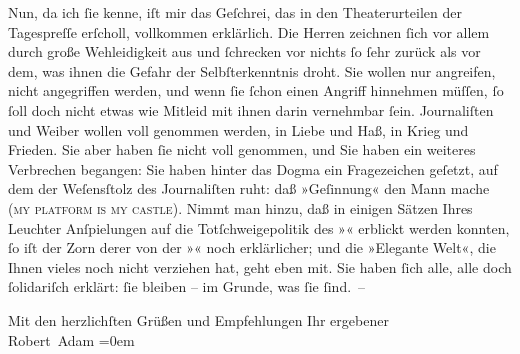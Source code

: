 \pstart
           Nun, da ich{ }ſie kenne, iſt mir das Geſchrei, das in den Theaterurteilen der
               Tagespreſſe erſcholl, vollkommen erklärlich. Die Herren zeichnen{ }ſich vor allem durch
               große Wehleidigkeit aus und{ }ſchrecken vor nichts{ }ſo{ }ſehr zurück als vor dem, was
               ihnen die Gefahr der Selbſterkenntnis droht. Sie wollen nur angreifen, nicht
               angegriffen werden, und wenn{ }ſie{ }ſchon einen Angriff hinnehmen müſſen,{ }ſo{ }ſoll doch
               nicht etwas wie Mitleid mit ihnen {\pb}darin
               vernehmbar{ }ſein. Journaliſten und Weiber wollen voll genommen werden, in Liebe und
               Haß, in Krieg und Frieden. Sie aber haben{ }ſie nicht voll genommen, und Sie haben ein
               weiteres Verbrechen begangen: Sie haben hinter das Dogma ein Fragezeichen geſetzt,
               auf dem der Weſensſtolz des Journaliſten ruht: daß »Geſinnung« den Mann mache (\textsc{my platform is my castle}). Nimmt man hinzu, daß in einigen
               Sätzen Ihres Leuchter
               Anſpielungen auf die Totſchweigepolitik des »\label{K_L02281-1v}\label{K_L02281-1}« erblickt werden konnten,{ }ſo iſt der
               Zorn derer von der »\label{K_L02281-2v}\label{K_L02281-2}« noch
               erklärlicher; und die »Elegante Welt«, die Ihnen vieles noch nicht verziehen hat,
               geht eben mit. Sie haben{ }ſich alle, alle doch{ }ſolidariſch erklärt:{ }ſie bleiben – im
               Grunde, was{ }ſie{ }ſind. –\pend
           
\pstart
           Mit den herzlichſten Grüßen {\pb}und
               Empfehlungen Ihr ergebener{\\[\baselineskip]}\spacefill\mbox{Robert Adam}\pend
           \leftskip=0em{}\endnumbering{}  \newcommand{\dateiname}{L02281}\newcommand{\titel}{Robert Adam an Arthur Schnitzler, 23. 11. 1917}\newcommand{\editorInnen}{Martin Anton Müller und Gerd-Hermann Susen}
